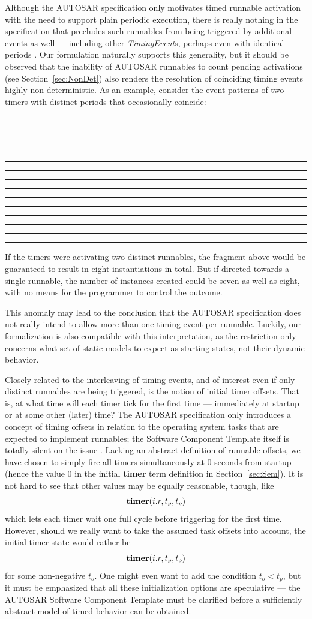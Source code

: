 \documentclass[10pt,conference]{IEEEtran}
\begin{document}
Although the AUTOSAR specification only motivates timed runnable activation with the need to support plain periodic execution, there is really nothing in the specification that precludes such runnables from being triggered by additional events as well --- including other \emph{TimingEvent}s, perhaps even with identical periods \cite[table~7.1, ch.~7.2.3]{AR:SWC}. Our formulation naturally supports this generality, but it should be observed that the inability of AUTOSAR runnables to count pending activations (see Section~\ref{sec:NonDet}) also renders the resolution of coinciding timing events highly non-deterministic. As an example, consider the event patterns of two timers with distinct periods that occasionally coincide:
\begin{center}
\rule{3mm}{1pt}%
						\rule[-9pt]{1mm}{10pt}%
\rule{2mm}{1pt}%
													\rule{1mm}{10pt}%
\rule{7mm}{1pt}%
						\rule[-9pt]{1mm}{10pt}%
\rule{1mm}{1pt}%
													\rule{1mm}{10pt}%
\rule{9mm}{1pt}%
									\rule[-9pt]{1mm}{19pt}%
\rule{9mm}{1pt}%
													\rule{1mm}{10pt}%
\rule{1mm}{1pt}%
						\rule[-9pt]{1mm}{10pt}%
\rule{4mm}{1pt}%
\end{center}
If the timers were activating two distinct runnables, the fragment above would be guaranteed to result in eight instantiations in total. But if directed towards a single runnable, the number of instances created could be seven as well as eight, with no means for the programmer to control the outcome.

This anomaly may lead to the conclusion that the AUTOSAR specification does not really intend to allow more than one timing event per runnable. Luckily, our formalization is also compatible with this interpretation, as the restriction only concerns what set of static models to expect as starting states, not their dynamic behavior.

Closely related to the interleaving of timing events, and of interest even if only distinct runnables are being triggered, is the notion of initial timer offsets. That is, at what time will each timer tick for the first time --- immediately at startup or at some other (later) time? The AUTOSAR specification only introduces a concept of timing offsets in relation to the operating system tasks that are expected to implement runnables; the Software Component Template itself is totally silent on the issue \cite{AR:SWC}. Lacking an abstract definition of runnable offsets, we have chosen to simply fire all timers simultaneously at $0$ seconds from startup (hence the value $0$ in the initial {\bf timer} term definition in Section~\ref{sec:Sem}). It is not hard to see that other values may be equally reasonable, though, like
$$
	\textbf{timer}(i.r,t_p,t_p)
$$
which lets each timer wait one full cycle before triggering for the first time. However, should we really want to take the assumed task offsets into account, the initial timer state would rather be
$$
	\textbf{timer}(i.r,t_p,t_o)
$$
for some non-negative $t_o$. One might even want to add the condition $t_o < t_p$, but it must be emphasized that all these initialization options are speculative --- the AUTOSAR Software Component Template must be clarified before a sufficiently abstract model of timed behavior can be obtained.
\end{document}
